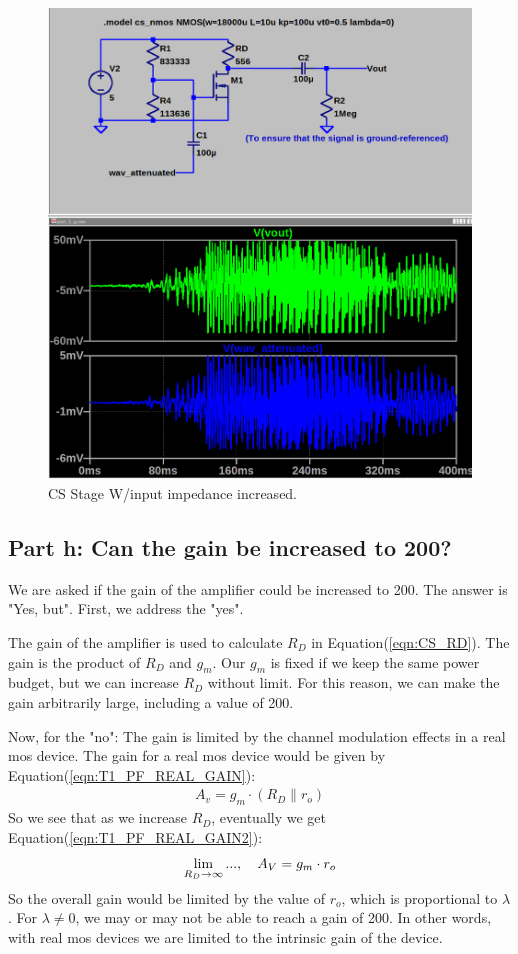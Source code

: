 \documentclass[11pt]{article}
\begin{document}
		\begin{figure}[h]
			\centering
			\includegraphics[width=0.85\linewidth]{task_1_g_easy_soln}
			\caption{CS Stage W/input impedance increased.}
			\label{fig:T1_PG_ALL}
			\vspace{1mm}
		\end{figure}
	
	\subsection{Part h: Can the gain be increased to 200?}
		We are asked if the gain of the amplifier could be increased to 200. The answer is "Yes, but". First, we address the "yes".
		
		The gain of the amplifier is used to calculate $R_D$ in Equation(\ref{eqn:CS_RD}). The gain is the product of $R_D$ and $g_m$. Our $g_m$ is fixed if we keep the same power budget, but we can increase $R_D$ without limit. For this reason, we can make the gain arbitrarily large, including a value of 200.
		
		Now, for the "no": The gain is limited by the channel modulation effects in a real mos device. The gain for a real mos device would be given by Equation(\ref{eqn:T1_PF_REAL_GAIN}):
		\begin{align}\label{eqn:T1_PF_REAL_GAIN} 
			A_v = g_m\cdot(R_D \parallel r_o)
		\end{align}
		So we see that as we increase $R_D$, eventually we get Equation(\ref{eqn:T1_PF_REAL_GAIN2}):
		\begin{equation} 
			\lim_{R_D \to \infty}...,\text{\quad}
			A_V = g_m\cdot r_o \label{eqn:T1_PF_REAL_GAIN2}
		\end{equation}
	So the overall gain would be limited by the value of $r_o$, which is proportional to $\lambda$. For $\lambda \neq 0$, we may or may not be able to reach a gain of 200. In other words, with real mos devices we are limited to the intrinsic gain of the device.
	
\end{document}
